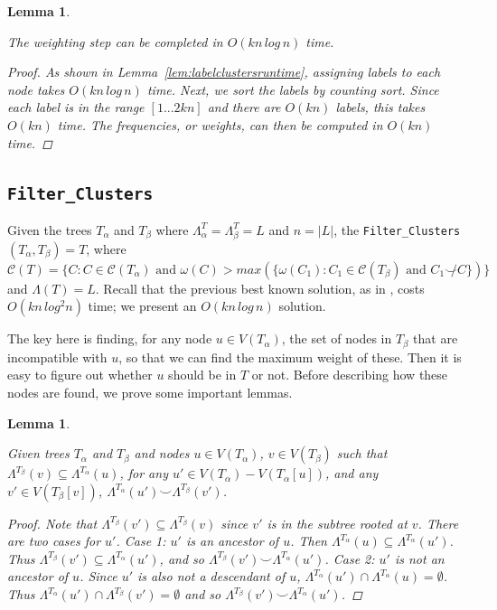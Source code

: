 \documentclass{article}
\newcommand{\compatible}{\smile}
\newcommand{\leafset}{\Lambda}
\newcommand{\weight}{\omega}
\newcommand{\TA}{T_\alpha}
\newcommand{\TB}{T_\beta}
\newtheorem{weightingruntime}[incompatibility]{Lemma}
\newtheorem{filterclusterssubsetcompatible}[incompatibility]{Lemma}
\begin{document}
    \medskip
    \begin{weightingruntime}
        \label{lem:weightingruntime}

        The weighting step can be completed in $O(kn\,log\,n)$ time.

        \begin{proof}
            As shown in Lemma~\ref{lem:labelclustersruntime}, assigning labels to each node takes $O(kn\,log\,n)$ time. Next, we sort the labels by counting sort. Since each label is in the range $[1 ... 2kn]$ and there are $O(kn)$ labels, this takes $O(kn)$ time. The frequencies, or weights, can then be computed in $O(kn)$ time.
        \end{proof}
    \end{weightingruntime}

    \subsection{\texttt{Filter\_Clusters}}
    \label{subsec:filterclusters}

    Given the trees $\TA$ and $\TB$ where $\leafset^\TA = \leafset^\TB = L$ and $n = |L|$, the \texttt{Filter\_Clusters}$(\TA, \TB) = T$, where $\mathcal{C}(T) = \{C : C \in \mathcal{C}(\TA) \text{ and } \weight(C) > max(\{\weight(C_1) : C_1 \in \mathcal{C}(\TB) \text{ and } C_1 \not\compatible C\})\}$ and $\leafset(T) = L$. Recall that the previous best known solution, as in \cite{jansson2018algorithms}, costs $O(kn\,log^2n)$ time; we present an $O(kn\,log\,n)$ solution.

    The key here is finding, for any node $u \in V(\TA)$, the set of nodes in $\TB$ that are incompatible with $u$, so that we can find the maximum weight of these. Then it is easy to figure out whether $u$ should be in $T$ or not. Before describing how these nodes are found, we prove some important lemmas.
    \newline

    \begin{filterclusterssubsetcompatible}
        \label{lem:filterclusterssubsetcompatible}

        Given trees $\TA$ and $\TB$ and nodes $u \in V(\TA)$, $v \in V(\TB)$ such that $\leafset^{\TB}(v) \subseteq \leafset^{\TA}(u)$, for any $u' \in V(\TA) - V(\TA[u])$, and any $v' \in V(\TB[v])$, $\leafset^{\TA}(u') \compatible \leafset^{\TB}(v')$.

        \begin{proof}
            Note that $\leafset^{\TB}(v') \subseteq \leafset^{\TB}(v)$ since $v'$ is in the subtree rooted at $v$. There are two cases for $u'$. \textit{Case 1}: $u'$ is an ancestor of $u$. Then $\leafset^{\TA}(u) \subseteq \leafset^{\TA}(u')$. Thus $\leafset^{\TB}(v') \subseteq \leafset^{\TA}(u')$, and so $\leafset^{\TB}(v') \compatible \leafset^{\TA}(u')$. \textit{Case 2}: $u'$ is not an ancestor of $u$. Since $u'$ is also not a descendant of $u$, $\leafset^{\TA}(u') \cap \leafset^{\TA}(u) = \emptyset$. Thus $\leafset^{\TA}(u') \cap \leafset^{\TB}(v') = \emptyset$ and so $\leafset^{\TB}(v') \compatible \leafset^{\TA}(u')$.
        \end{proof}
    \end{filterclusterssubsetcompatible}
\end{document}
